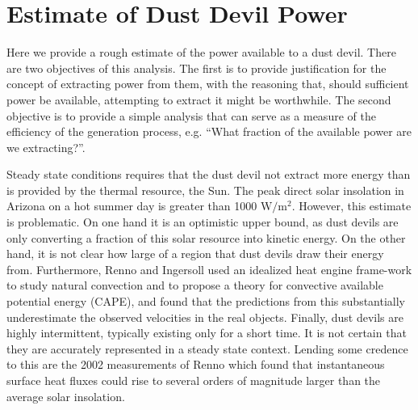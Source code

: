 %


%
%


\section{Estimate of Dust Devil Power}
\label{sec:estimate_power}

Here we provide a rough estimate of the power
available to a dust devil. There are two objectives of this
analysis. The first is to provide justification for the concept of
extracting power from them, with the reasoning that, should
sufficient power be available, attempting to extract it might be
worthwhile. The second objective is to provide a simple analysis that
can serve as a measure of the efficiency of the generation process,
e.g. ``What fraction of the available power are we extracting?''.  

Steady state conditions requires that the dust devil not
extract more energy than is provided by the thermal resource, the Sun.   
The peak direct solar insolation in Arizona on a hot summer day is
greater than 1000 $\text{W}/\text{m}^2$. However, this estimate is problematic. 
On one hand it is an optimistic upper bound, as dust devils are only
converting a fraction of this solar resource into kinetic
energy. On the other hand, it is not clear how large of a region
that dust devils draw their energy from. 
Furthermore, Renno and Ingersoll\cite{renno1996natural} used an
idealized heat engine frame-work to study natural convection and to
propose a theory for convective available potential energy (CAPE),
and found that the predictions from this substantially underestimate the
observed velocities in the real objects. Finally, dust devils are highly 
intermittent, typically existing only for a short time. It is
not certain that they are accurately represented in a steady
state context. Lending some credence to this are the 2002 measurements of
Renno\cite{renno2004matador} which found that instantaneous surface heat
fluxes could rise to several orders of magnitude larger than the
average solar insolation.  

